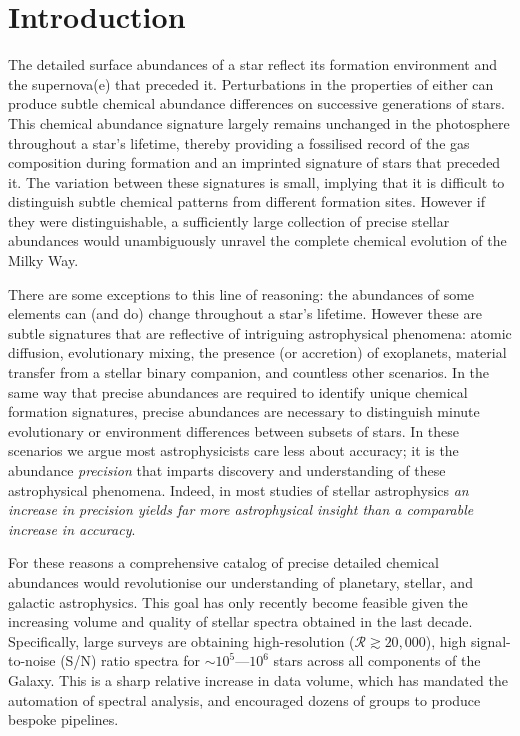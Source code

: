 \documentclass[12pt,preprint]{aastex}
\begin{document}
\section{Introduction}
The detailed surface abundances of a star reflect its formation environment and
the supernova(e) that preceded it.  Perturbations in the properties of 
either can produce subtle chemical abundance differences on successive
generations of stars.  This chemical abundance signature largely remains 
unchanged in the photosphere throughout a star's lifetime, thereby providing a 
fossilised record of the gas composition during formation and an imprinted 
signature of stars that preceded it.  The variation between these signatures is 
small, implying that it is difficult to distinguish subtle chemical patterns 
from different formation sites.  However if they were distinguishable, a 
sufficiently large collection of precise stellar abundances would unambiguously
unravel the complete chemical evolution of the Milky Way.


There are some exceptions to this line of reasoning: the abundances of some
elements can (and do) change throughout a star's lifetime.  However these are
subtle signatures that are reflective of intriguing astrophysical phenomena:
atomic diffusion, evolutionary mixing, the presence (or accretion) of 
exoplanets, material transfer from a stellar binary companion, and countless
other scenarios.  In the same way that precise abundances are required to 
identify unique chemical formation signatures, precise abundances are necessary
to distinguish minute evolutionary or environment differences between subsets of
stars.  In these scenarios we argue most astrophysicists care less about
accuracy; it is the abundance \emph{precision} that imparts discovery and 
understanding of these astrophysical phenomena.  Indeed, in most studies of 
stellar astrophysics \textit{an increase in precision yields far more 
astrophysical insight than a comparable increase in accuracy}.


For these reasons a comprehensive catalog of precise detailed chemical 
abundances would revolutionise our understanding of planetary, stellar, and 
galactic astrophysics.  This goal has only recently become feasible given the 
increasing volume and quality of stellar spectra obtained in the last decade.  
Specifically, large surveys are obtaining high-resolution 
($\mathcal{R} \gtrsim 20,000$), high signal-to-noise (S/N) ratio spectra for
$\sim10^5$---$10^6$ stars across all components of the Galaxy.  This is a sharp
relative increase in data volume, which has mandated the automation of spectral
analysis, and encouraged dozens of groups to produce bespoke pipelines.
\end{document}
